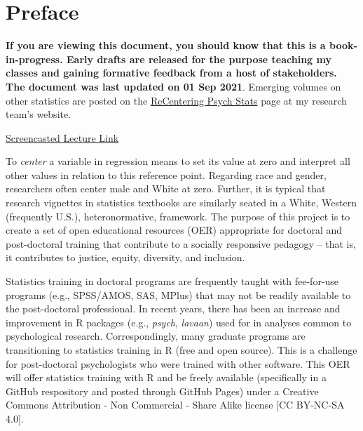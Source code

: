 \documentclass[
  english,
]{book}
\begin{document}
\hypertarget{preface}{%
\chapter*{Preface}\label{preface}}

\textbf{If you are viewing this document, you should know that this is a book-in-progress. Early drafts are released for the purpose teaching my classes and gaining formative feedback from a host of stakeholders. The document was last updated on 01 Sep 2021}. Emerging volumes on other statistics are posted on the \href{https://lhbikos.github.io/BikosRVT/ReCenter.html}{ReCentering Psych Stats} page at my research team's website.

\href{https://spu.hosted.panopto.com/Panopto/Pages/Viewer.aspx?id=c932455e-ef06-444a-bdca-acf7012d759a}{Screencasted Lecture Link}

To \emph{center} a variable in regression means to set its value at zero and interpret all other values in relation to this reference point. Regarding race and gender, researchers often center male and White at zero. Further, it is typical that research vignettes in statistics textbooks are similarly seated in a White, Western (frequently U.S.), heteronormative, framework. The purpose of this project is to create a set of open educational resources (OER) appropriate for doctoral and post-doctoral training that contribute to a socially responsive pedagogy -- that is, it contributes to justice, equity, diversity, and inclusion.

Statistics training in doctoral programs are frequently taught with fee-for-use programs (e.g., SPSS/AMOS, SAS, MPlus) that may not be readily available to the post-doctoral professional. In recent years, there has been an increase and improvement in R packages (e.g., \emph{psych}, \emph{lavaan}) used for in analyses common to psychological research. Correspondingly, many graduate programs are transitioning to statistics training in R (free and open source). This is a challenge for post-doctoral psychologists who were trained with other software. This OER will offer statistics training with R and be freely available (specifically in a GitHub respository and posted through GitHub Pages) under a Creative Commons Attribution - Non Commercial - Share Alike license {[}CC BY-NC-SA 4.0{]}.
\end{document}
